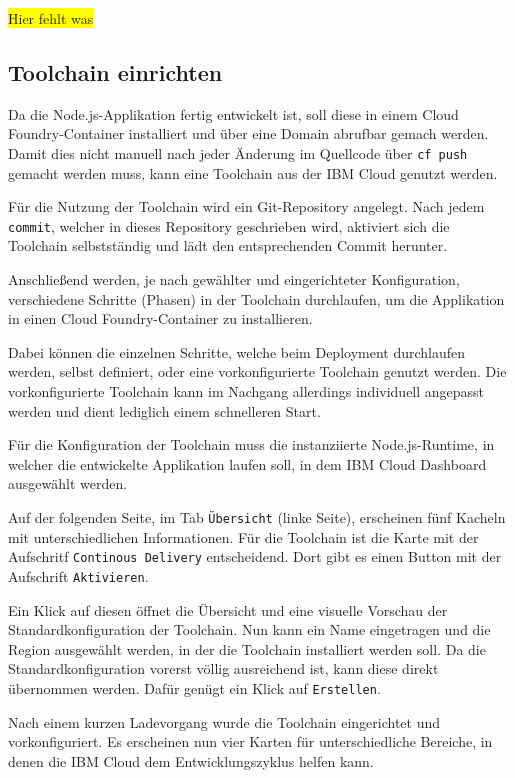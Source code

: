 \colorbox{yellow}{Hier fehlt was}

\subsection{Toolchain einrichten}
Da die Node.js-Applikation fertig entwickelt ist, soll diese in einem Cloud Foundry-Container installiert und über eine
Domain abrufbar gemach werden. Damit dies nicht manuell nach jeder Änderung im Quellcode über \texttt{cf push} gemacht
werden muss, kann eine Toolchain aus der IBM Cloud genutzt werden.

Für die Nutzung der Toolchain wird ein Git-Repository angelegt. Nach jedem \texttt{commit}, welcher in dieses Repository
geschrieben wird, aktiviert sich die Toolchain selbstständig und lädt den entsprechenden Commit herunter.

Anschließend werden, je nach gewählter und eingerichteter Konfiguration, verschiedene Schritte (Phasen) in der Toolchain
durchlaufen, um die Applikation in einen Cloud Foundry-Container zu installieren.

Dabei können die einzelnen Schritte, welche beim Deployment durchlaufen werden, selbst definiert, oder eine
vorkonfigurierte Toolchain genutzt werden. Die vorkonfigurierte Toolchain kann im Nachgang allerdings individuell
angepasst werden und dient lediglich einem schnelleren Start.

Für die Konfiguration der Toolchain muss die instanziierte Node.js-Runtime, in welcher die entwickelte Applikation laufen
soll, in dem IBM Cloud Dashboard ausgewählt werden.

Auf der folgenden Seite, im Tab \texttt{Übersicht} (linke Seite), erscheinen fünf Kacheln mit unterschiedlichen Informationen.
Für die Toolchain ist die Karte mit der Aufschritf \texttt{Continous Delivery} entscheidend. Dort gibt es einen Button
mit der Aufschrift \texttt{Aktivieren}.

Ein Klick auf diesen öffnet die Übersicht und eine visuelle Vorschau der Standardkonfiguration der Toolchain. Nun kann ein
Name eingetragen und die Region ausgewählt werden, in der die Toolchain installiert werden soll. Da die Standardkonfiguration
vorerst völlig ausreichend ist, kann diese direkt übernommen werden. Dafür genügt ein Klick auf \texttt{Erstellen}.

Nach einem kurzen Ladevorgang wurde die Toolchain eingerichtet und vorkonfiguriert. Es erscheinen nun vier Karten für
unterschiedliche Bereiche, in denen die IBM Cloud dem Entwicklungszyklus helfen kann.

